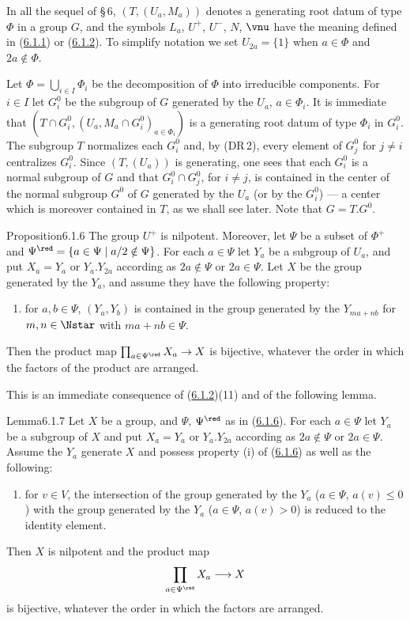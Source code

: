 \documentclass[12pt,a4paper,oneside,english]{smfart}
\makeatletter
\newcommand{\btanchor}[1]{\leavevmode\Hy@raisedlink{\hypertarget{bt:#1}{}}}
\newcommand{\btref}[1]{\hyperlink{bt:#1}{#1}}
\theoremstyle{definition}
\theoremstyle{bt}
\makeatother
\begin{document}
\btanchor{6.1.4} In all the sequel of \S\,6, $(T,(U_a,M_a))$ denotes a generating
root datum of type $\Phi$ in a group $G$, and the symbols $L_a$, $U^{+}$,
$U^{-}$, $N$, $\vnu$ have the meaning defined in (\btref{6.1.1}) or (\btref{6.1.2}). To simplify
notation we set $U_{2a}=\{1\}$ when $a\in\Phi$ and $2a\notin\Phi$.

\btanchor{6.1.5} Let $\Phi=\bigcup_{i\in I}\Phi_i$ be the decomposition of $\Phi$
into irreducible components. For $i\in I$ let $G_i^{0}$ be the subgroup of $G$
generated by the $U_a$, $a\in\Phi_i$. It is immediate that
$(T\cap G_i^{0},(U_a,M_a\cap G_i^{0})_{a\in\Phi_i})$ is a generating root datum
of type $\Phi_i$ in $G_i^{0}$. The subgroup $T$ normalizes each $G_i^{0}$ and, by
(DR\,2), every element of $G_j^{0}$ for $j\ne i$ centralizes $G_i^{0}$. Since
$(T,(U_a))$ is generating, one sees that each $G_i^{0}$ is a normal subgroup of
$G$ and that $G_i^{0}\cap G_j^{0}$, for $i\ne j$, is contained in the center of
the normal subgroup $G^{0}$ of $G$ generated by the $U_a$ (or by the $G_i^{0}$)
--- a center which is moreover contained in $T$, as we shall see later. Note that
$G=T.G^{0}$.

\begin{stmt}{Proposition}{6.1.6}\btanchor{6.1.6}
The group $U^{+}$ is nilpotent. Moreover, let $\Psi$ be a subset of $\Phi^{+}$
and $\Psi^{\red}=\{a\in\Psi\mid a/2\notin\Psi\}$. For each $a\in\Psi$ let $Y_a$
be a subgroup of $U_a$, and put $X_a=Y_a$ or $Y_a.Y_{2a}$ according as
$2a\notin\Psi$ or $2a\in\Psi$. Let $X$ be the group generated by the $Y_a$, and
assume they have the following property:
\begin{enumerate}
\item[(i)] for $a,b\in\Psi$, $(Y_a,Y_b)$ is contained in the group generated by
the $Y_{ma+nb}$ for $m,n\in\Nstar$ with $ma+nb\in\Psi$.
\end{enumerate}
Then the product map $\prod_{a\in\Psi^{\red}}X_a\to X$ is bijective, whatever the
order in which the factors of the product are arranged.
\end{stmt}
\noindent This is an immediate consequence of (\btref{6.1.2})(11) and of the following
lemma.

\begin{stmt}{Lemma}{6.1.7}\btanchor{6.1.7}
Let $X$ be a group, and $\Psi$, $\Psi^{\red}$ as in (\btref{6.1.6}). For each $a\in\Psi$
let $Y_a$ be a subgroup of $X$ and put $X_a=Y_a$ or $Y_a.Y_{2a}$ according as
$2a\notin\Psi$ or $2a\in\Psi$. Assume the $Y_a$ generate $X$ and possess property
(i) of (\btref{6.1.6}) as well as the following:
\begin{enumerate}
\item[(ii)] for $v\in V$, the intersection of the group generated by the $Y_a$
($a\in\Psi$, $a(v)\le 0$) with the group generated by the $Y_a$ ($a\in\Psi$,
$a(v)>0$) is reduced to the identity element.
\end{enumerate}
Then $X$ is nilpotent and the product map
\begin{equation}
\prod_{a\in\Psi^{\red}}X_a\longrightarrow X
\end{equation}
is bijective, whatever the order in which the factors are arranged.
\end{stmt}
\end{document}
